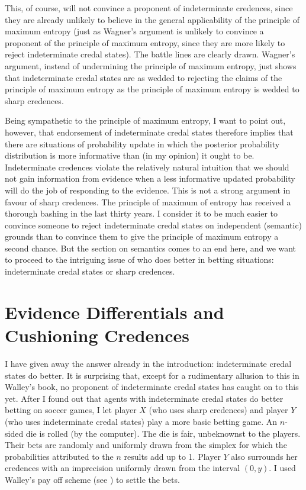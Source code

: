 \documentclass[11pt]{article}
\begin{document}
This, of course, will not convince a proponent of indeterminate
credences, since they are already unlikely to believe in the general
applicability of the principle of maximum entropy (just as Wagner's
argument is unlikely to convince a proponent of the principle of
maximum entropy, since they are more likely to reject indeterminate
credal states). The battle lines are clearly drawn. Wagner's argument,
instead of undermining the principle of maximum entropy, just shows
that indeterminate credal states are as wedded to rejecting the claims
of the principle of maximum entropy as the principle of maximum
entropy is wedded to sharp credences. 

Being sympathetic to the principle of maximum entropy, I want to
point out, however, that endorsement of indeterminate credal states
therefore implies that there are situations of probability update in
which the posterior probability distribution is more informative than
(in my opinion) it ought to be. Indeterminate credences violate the
relatively natural intuition that we should not gain information from
evidence when a less informative updated probability will do the job
of responding to the evidence. This is not a strong argument in favour
of sharp credences. The principle of maximum of entropy has received a
thorough bashing in the last thirty years. I consider it to be much
easier to convince someone to reject indeterminate credal states on
independent (semantic) grounds than to convince them to give the
principle of maximum entropy a second chance. But the section on
semantics comes to an end here, and we want to proceed to the
intriguing issue of who does better in betting situations:
indeterminate credal states or sharp credences.

\section{Evidence Differentials and Cushioning Credences} 
\label{WalleysWorldCupWoes}

I have given away the answer already in the introduction:
indeterminate credal states do better. It is surprising that, except
for a rudimentary allusion to this in Walley's book, no proponent of
indeterminate credal states has caught on to this yet. After I found
out that agents with indeterminate credal states do better betting on
soccer games, I let player $X$ (who uses sharp credences) and player
$Y$ (who uses indeterminate credal states) play a more basic betting
game. An $n$-sided die is rolled (by the computer). The die is fair,
unbeknownst to the players. Their bets are randomly and uniformly
drawn from the simplex for which the probabilities attributed to the
$n$ results add up to 1. Player $Y$ also surrounds her credences with
an imprecision uniformly drawn from the interval $(0,y)$. I used
Walley's pay off scheme (see ) to settle the
bets.
\end{document}
